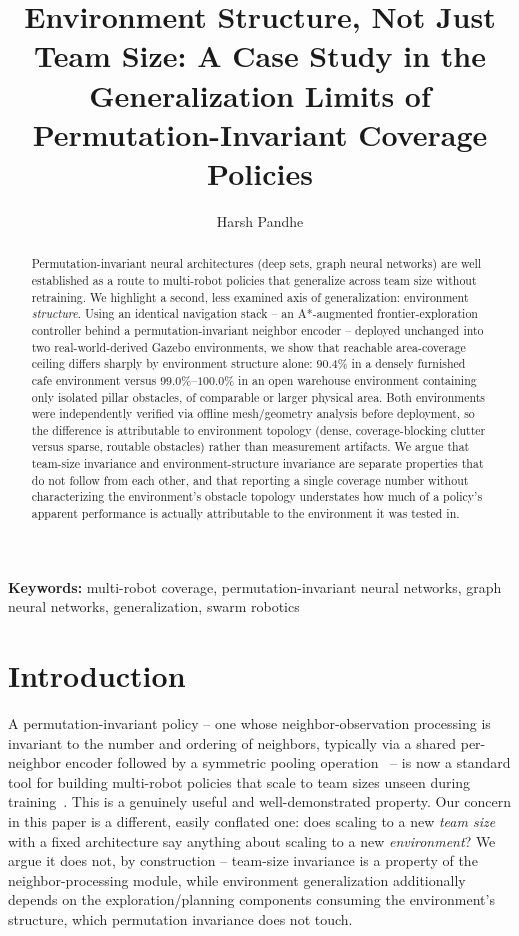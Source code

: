 \documentclass[12pt]{article}
\title{Environment Structure, Not Just Team Size: A Case Study in the\\
Generalization Limits of Permutation-Invariant Coverage Policies}
\author[1]{Harsh Pandhe}
\affil[1]{Independent Research \\ \texttt{harshpandhehome@gmail.com}}
\date{}
\begin{document}
\maketitle

\begin{abstract}
\noindent
Permutation-invariant neural architectures (deep sets, graph neural networks)
are well established as a route to multi-robot policies that generalize
across team size without retraining. We highlight a second, less examined
axis of generalization: environment \emph{structure}. Using an identical
navigation stack -- an A*-augmented frontier-exploration controller behind a
permutation-invariant neighbor encoder -- deployed unchanged into two
real-world-derived Gazebo environments, we show that reachable area-coverage
ceiling differs sharply by environment structure alone: $90.4\%$ in a densely
furnished cafe environment versus $99.0\%$--$100.0\%$ in an open warehouse
environment containing only isolated pillar obstacles, of comparable or
larger physical area. Both environments were independently verified via
offline mesh/geometry analysis before deployment, so the difference is
attributable to environment topology (dense, coverage-blocking clutter versus
sparse, routable obstacles) rather than measurement artifacts. We argue that
team-size invariance and environment-structure invariance are separate
properties that do not follow from each other, and that reporting a single
coverage number without characterizing the environment's obstacle topology
understates how much of a policy's apparent performance is actually
attributable to the environment it was tested in.
\end{abstract}

\noindent\textbf{Keywords:} multi-robot coverage, permutation-invariant
neural networks, graph neural networks, generalization, swarm robotics

\section{Introduction}
A permutation-invariant policy -- one whose neighbor-observation processing
is invariant to the number and ordering of neighbors, typically via a shared
per-neighbor encoder followed by a symmetric pooling
operation~\cite{zaheer2017deepsets} -- is now a standard tool for building
multi-robot policies that scale to team sizes unseen during
training~\cite{multientitypinn2024,localcanon2025,gnnrealworld2021}. This is
a genuinely useful and well-demonstrated property. Our concern in this paper
is a different, easily conflated one: does scaling to a new \emph{team size}
with a fixed architecture say anything about scaling to a new
\emph{environment}? We argue it does not, by construction -- team-size
invariance is a property of the neighbor-processing module, while
environment generalization additionally depends on the exploration/planning
components consuming the environment's structure, which permutation
invariance does not touch.
\end{document}
